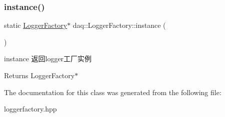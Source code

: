 \subsubsection{\texorpdfstring{instance()}{instance()}}
{\footnotesize\ttfamily static \hyperlink{classdaq_1_1LoggerFactory}{Logger\+Factory}$\ast$ daq\+::\+Logger\+Factory\+::instance (\begin{DoxyParamCaption}{ }\end{DoxyParamCaption})\hspace{0.3cm}{\ttfamily [static]}}



instance 返回logger工厂实例 

\begin{DoxyReturn}{Returns}
Logger\+Factory$\ast$ 
\end{DoxyReturn}


The documentation for this class was generated from the following file\+:\begin{DoxyCompactItemize}
\item 
loggerfactory.\+hpp\end{DoxyCompactItemize}
